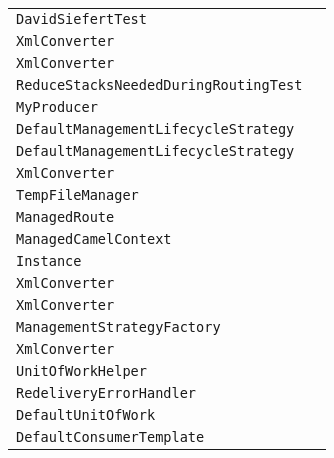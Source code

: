 \begin{center}
\begin{tabular}{ll}
\lstinline/DavidSiefertTest/&\raisebox{0pt}{\lstinline/testHeaderPredicateFails()/}\\
\lstinline/XmlConverter/&\raisebox{0pt}{\lstinline/createDocumentBuilderFactory()/}\\
\lstinline/XmlConverter/&\raisebox{0pt}{\lstinline/createSAXParserFactory()/}\\
\lstinline/ReduceStacksNeededDuringRoutingTest/&\raisebox{0pt}{\lstinline/process(Exchange)/}\\
\lstinline/MyProducer/&\raisebox{0pt}{\lstinline/booleanprocess(Exchange,AsyncCallback=)/}\\
\lstinline/DefaultManagementLifecycleStrategy/&\raisebox{0pt}{\lstinline/onEndpointAdd(Endpointendpoint)/}\\
\lstinline/DefaultManagementLifecycleStrategy/&\raisebox{0pt}{\lstinline/onContextStop(CamelContextcontext)/}\\
\lstinline/XmlConverter/&\raisebox{0pt}{\lstinline/setupFeatures(DocumentBuilderFactory)/}\\
\lstinline/TempFileManager/&\raisebox{0pt}{\lstinline/onDone(Exchange)/}\\
\lstinline/ManagedRoute/&\raisebox{0pt}{\lstinline/updateRouteFromXml(String)/}\\
\lstinline/ManagedCamelContext/&\raisebox{0pt}{\lstinline/addOrUpdateRoutesFromXml(String,boolean)/}\\
\lstinline/Instance/&\raisebox{0pt}{\lstinline/manageCamelContext(Container,CamelContext)/}\\
\lstinline/XmlConverter/&\raisebox{0pt}{\lstinline/createTransformerFactory()/}\\
\lstinline/XmlConverter/&\raisebox{0pt}{\lstinline/createSAXParserFactory()/}\\
\lstinline/ManagementStrategyFactory/&\raisebox{0pt}{\lstinline/ManagementStrategycreate(CamelContext,boolean)/}\\
\lstinline/XmlConverter/&\raisebox{0pt}{\lstinline/configureSaxonTransformerFactory(TransformerFactory)/}\\
\lstinline/UnitOfWorkHelper/&\raisebox{0pt}{\lstinline/doneSynchronizations(Exchange,List<Synchronization>,Logger)/}\\
\lstinline/RedeliveryErrorHandler/&\raisebox{0pt}{\lstinline/onExceptionOccurred(Exchange,RedeliveryData)/}\\
\lstinline/DefaultUnitOfWork/&\raisebox{0pt}{\lstinline/done(Exchange)/}\\
\lstinline/DefaultConsumerTemplate/&\raisebox{0pt}{\lstinline/doneUoW(Exchange)/}\\

\end{tabular}
\end{center}
